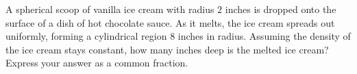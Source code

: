 A spherical scoop of vanilla ice cream with radius $2$ inches is dropped onto the surface of a dish of hot chocolate sauce. As it melts, the ice cream spreads out uniformly, forming a cylindrical region $8$ inches in radius. Assuming the density of the ice cream stays constant, how many inches deep is the melted ice cream? Express your answer as a common fraction.
